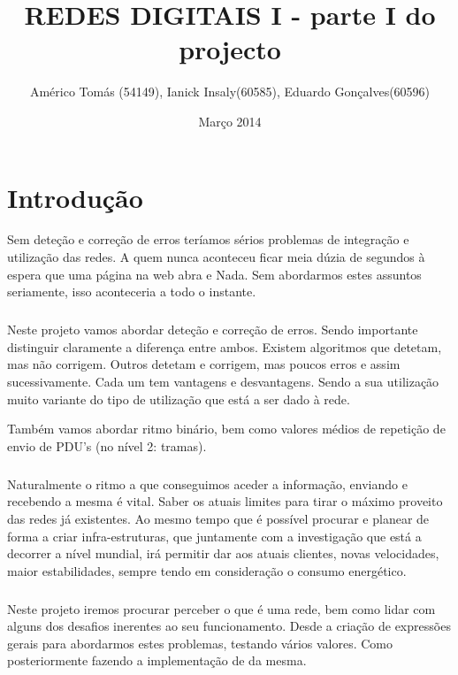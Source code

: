 \documentclass[13pt,a4paper]{report}
\title{REDES DIGITAIS I - parte I do projecto}
\author{Américo Tomás (54149), Ianick Insaly(60585), Eduardo Gonçalves(60596) }
\date{Março 2014}
\begin{document}
\maketitle

\tableofcontents %

\chapter{Introdução}

Sem deteção e correção de erros teríamos sérios problemas de integração e utilização das redes. A quem nunca aconteceu ficar meia dúzia de segundos à espera que uma página na web abra e Nada. Sem abordarmos estes assuntos seriamente, isso aconteceria a todo o instante. 

\paragraph{}
Neste projeto vamos abordar deteção e correção de erros. Sendo importante distinguir claramente a diferença entre ambos. Existem algoritmos que detetam, mas não corrigem. Outros detetam e corrigem, mas poucos erros e assim sucessivamente. Cada um tem vantagens e desvantagens. Sendo a sua utilização muito variante do tipo de utilização que está a ser dado à rede.

Também vamos abordar ritmo binário, bem como valores médios de repetição de envio de PDU's (no nível 2: tramas).

\paragraph{}
Naturalmente o ritmo a que conseguimos aceder a informação, enviando e recebendo a mesma é vital. Saber os atuais limites para tirar o máximo proveito das redes já existentes. Ao mesmo tempo que é possível procurar e planear de forma a criar infra-estruturas, que juntamente com a investigação que está a decorrer a nível mundial, irá permitir dar aos atuais clientes, novas velocidades, maior estabilidades, sempre tendo em consideração o consumo energético.

\paragraph{}
Neste projeto iremos procurar perceber o que é uma rede, bem como lidar com alguns dos desafios inerentes ao seu funcionamento. Desde a criação de expressões gerais para abordarmos estes problemas, testando vários valores. Como posteriormente fazendo a implementação de da mesma.
\end{document}
